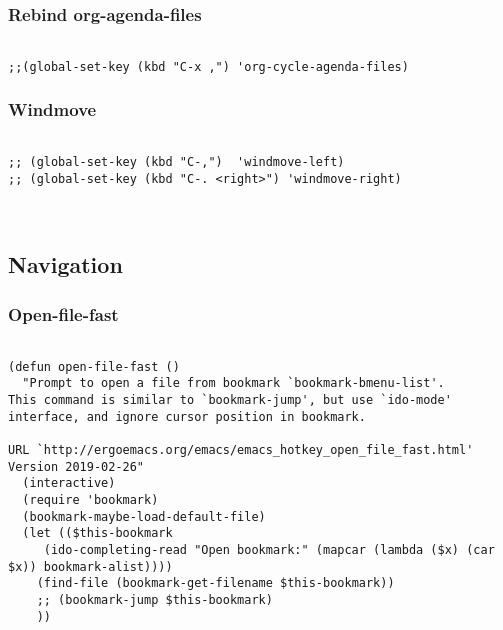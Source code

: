 \documentclass[11pt]{article}
\begin{document}
\subsubsection{Rebind org-agenda-files}
\label{sec:orgfd4cfe6}
\begin{verbatim}

;;(global-set-key (kbd "C-x ,") 'org-cycle-agenda-files)
\end{verbatim}
\subsubsection{Windmove}
\label{sec:org9b5fa47}
\begin{verbatim}

;; (global-set-key (kbd "C-,")  'windmove-left)
;; (global-set-key (kbd "C-. <right>") 'windmove-right)



\end{verbatim}
\subsection{Navigation}
\label{sec:orgeededc0}
\subsubsection{Open-file-fast}
\label{sec:org67ebb95}
\begin{verbatim}

(defun open-file-fast ()
  "Prompt to open a file from bookmark `bookmark-bmenu-list'.
This command is similar to `bookmark-jump', but use `ido-mode' interface, and ignore cursor position in bookmark.

URL `http://ergoemacs.org/emacs/emacs_hotkey_open_file_fast.html'
Version 2019-02-26"
  (interactive)
  (require 'bookmark)
  (bookmark-maybe-load-default-file)
  (let (($this-bookmark
	 (ido-completing-read "Open bookmark:" (mapcar (lambda ($x) (car $x)) bookmark-alist))))
    (find-file (bookmark-get-filename $this-bookmark))
    ;; (bookmark-jump $this-bookmark)
    ))

\end{verbatim}
\end{document}
